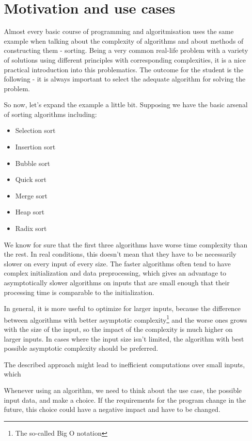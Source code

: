 \chapter{Motivation and use cases}

Almost every basic course of programming and algoritmisation uses the same example when talking about the complexity of algorithms and about methods of constructing them - sorting. Being a very common real-life problem with a variety of solutions using different principles with corresponding complexities, it is a nice practical introduction into this problematics. The outcome for the student is the following - it is always important to select the adequate algorithm for solving the problem.

So now, let's expand the example a little bit. Supposing we have the basic arsenal of sorting algorithms including:

\begin{itemize}
	\item Selection sort
	\item Insertion sort
	\item Bubble sort
	\item Quick sort
	\item Merge sort
	\item Heap sort
	\item Radix sort
\end{itemize}

We know for sure that the first three algorithms have worse time complexity than the rest. In real conditions, this doesn't mean that they have to be necessarily slower on every input of every size. The faster algorithms often tend to have complex initialization and data preprocessing, which gives an advantage to asymptotically slower algorithms on inputs that are small enough that their processing time is comparable to the initialization. 

In general, it is more useful to optimize for larger inputs, because the difference between algorithms with better asymptotic complexity\footnote{The so-called Big O notation} and the worse ones grows with the size of the input, so the impact of the complexity is much higher on larger inputs. In cases where the input size isn't limited, the algorithm with best possible asymptotic complexity should be preferred.

The described approach might lead to inefficient computations over small inputs, which 

Whenever using an algorithm, we need to think about the use case, the possible input data, and make a choice. If the requirements for the program change in the future, this choice could have a negative impact and have to be changed.

